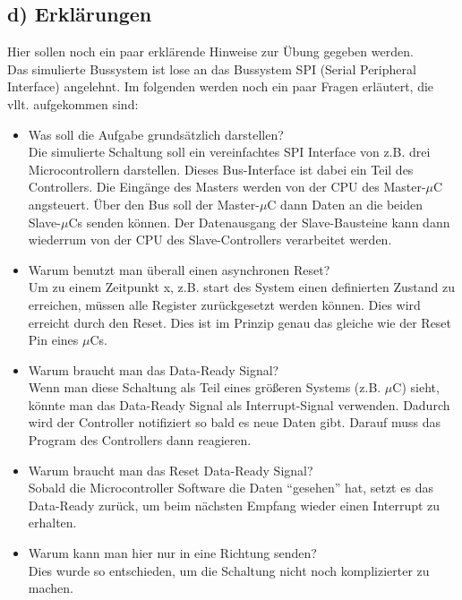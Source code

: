 \documentclass[a4paper]{scrartcl}
\begin{document}
\subsection*{d) Erklärungen}
Hier sollen noch ein paar erklärende Hinweise zur Übung gegeben werden.\\
Das simulierte Bussystem ist lose an das Bussystem SPI (Serial Peripheral Interface) angelehnt. Im folgenden werden noch ein paar Fragen erläutert, die 
vllt. aufgekommen sind:
\begin{itemize}
  \item Was soll die Aufgabe grundsätzlich darstellen?\\
  Die simulierte Schaltung soll ein vereinfachtes SPI Interface von z.B. drei Microcontrollern darstellen. Dieses Bus-Interface ist dabei ein Teil des Controllers.
  Die Eingänge des Masters  werden von der CPU
  des Master-$\mu$C angsteuert. Über den Bus soll der Master-$\mu$C dann Daten an die beiden Slave-$\mu$Cs senden können. Der Datenausgang der Slave-Bausteine kann dann
  wiederrum von der CPU des Slave-Controllers verarbeitet werden.
  \item Warum benutzt man überall einen asynchronen Reset?\\
  Um zu einem Zeitpunkt x, z.B. start des System einen definierten Zustand zu erreichen, müssen alle Register zurückgesetzt werden können. Dies wird erreicht durch 
  den Reset. Dies ist im Prinzip genau das gleiche wie der Reset Pin eines $\mu$Cs.
  \item Warum braucht man das Data-Ready Signal?\\
  Wenn man diese Schaltung als Teil eines größeren Systems (z.B. $\mu$C) sieht, könnte man das Data-Ready Signal als Interrupt-Signal verwenden. Dadurch wird
  der Controller notifiziert so bald es neue Daten gibt. Darauf muss das Program des Controllers dann reagieren.
  \item Warum braucht man das Reset Data-Ready Signal?\\
  Sobald die Microcontroller Software die Daten ``gesehen'' hat, setzt es das Data-Ready zurück, um beim nächsten Empfang wieder einen Interrupt zu erhalten.
  \item Warum kann man hier nur in eine Richtung senden?\\
  Dies wurde so entschieden, um die Schaltung nicht noch komplizierter zu machen.
\end{itemize}
\end{document}
